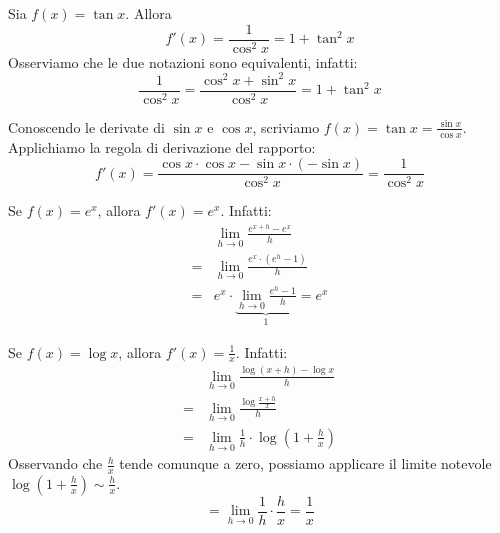 \begin{remark}
Sia $f(x) = \tan x$. Allora
\begin{equation*}
f'(x) = \frac{1}{\cos^2 x} = 1 + \tan^2 x
\end{equation*}
Osserviamo che le due notazioni sono equivalenti, infatti:
\begin{equation*}
\frac{1}{\cos^2 x} = \frac{\cos^2x + \sin^2x}{\cos^2x} = 1 + \tan^2x 
\end{equation*}

Conoscendo le derivate di $\sin x$ e $\cos x$, scriviamo $f(x) = \tan x = \frac{\sin x}{\cos x}$. Applichiamo la regola di derivazione del rapporto:
\begin{equation*}
f'(x) = \frac{\cos x \cdot \cos x - \sin x \cdot (-\sin x)}{\cos^2 x} = \frac{1}{\cos^2x}
\end{equation*}
\end{remark}

\begin{remark}
Se $f(x) = e^x$, allora $f'(x) = e^x$. Infatti:
\begingroup
\addtolength{\jot}{1ex}
\begin{align*}
& \lim_{h \to 0} \frac{e^{x+h} - e^x}{h} \\
= & \lim_{h \to 0} \frac{e^x \cdot (e^h - 1)}{h} \\
= & e^x \cdot \underbrace{\lim_{h \to 0} \frac{e^h - 1}{h}}_{1} = e^x
\end{align*}
\endgroup
\end{remark}

\begin{remark}
Se $f(x) = \log x$, allora $f'(x) = \frac{1}{x}$. Infatti:
\begingroup
\addtolength{\jot}{1ex}
\begin{align*}
& \lim_{h \to 0} \frac{\log (x+h) - \log x}{h} \\
= & \lim_{h \to 0} \frac{\log \frac{x+h}{x}}{h} \\
= & \lim_{h \to 0} \frac{1}{h} \cdot \log \left(1 + \frac{h}{x} \right) 
\end{align*}
\endgroup
Osservando che $\frac{h}{x}$ tende comunque a zero, possiamo applicare il limite notevole $\log (1 + \frac{h}{x} ) \sim \frac{h}{x}$.
\begin{equation*}
= \lim_{h \to 0} \frac{1}{h} \cdot \frac{h}{x} = \frac{1}{x}
\end{equation*}
\end{remark}

